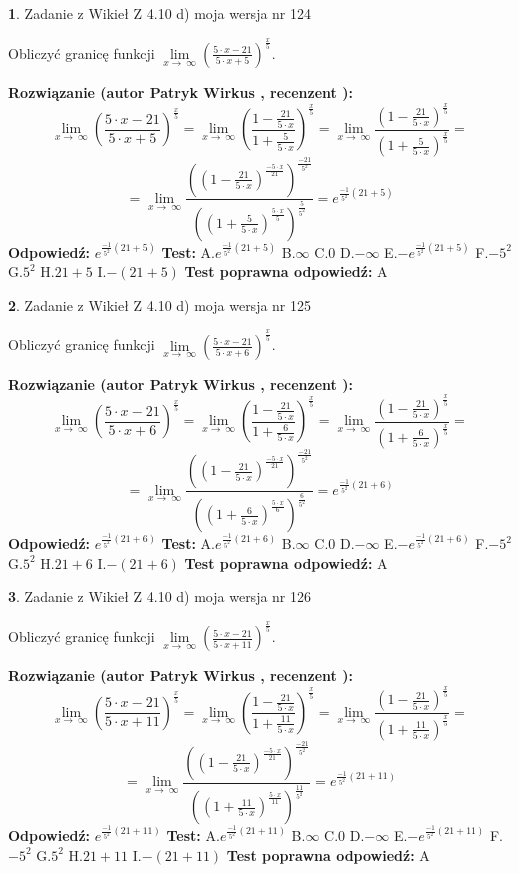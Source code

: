 \documentclass[12pt, a4paper]{article}
\theoremstyle{definition} %
\newtheorem{zad}{}
\newcommand{\zadStart}[1]{\begin{zad}#1\newline}
\newcommand{\zadStop}{\end{zad}}
\newcommand{\rozwStart}[2]{\noindent \textbf{Rozwiązanie (autor #1 , recenzent #2): }\newline}
\newcommand{\rozwStop}{\newline}
\newcommand{\odpStart}{\noindent \textbf{Odpowiedź:}\newline}
\newcommand{\odpStop}{\newline}
\newcommand{\testStart}{\noindent \textbf{Test:}\newline}
\newcommand{\testStop}{\newline}
\newcommand{\kluczStart}{\noindent \textbf{Test poprawna odpowiedź:}\newline}
\newcommand{\kluczStop}{\newline}
\begin{document}
\zadStart{Zadanie z Wikieł Z 4.10 d) moja wersja nr 124}


Obliczyć granicę funkcji  $\lim\limits_{x\to\ \infty}(\frac{5\cdot x-21}{5\cdot x+5})^{\frac{x}{5}}$.
\zadStop
\rozwStart{Patryk Wirkus}{}
$$\lim\limits_{x\to\ \infty}(\frac{5\cdot x-21}{5\cdot x+5})^{\frac{x}{5}} = \lim\limits_{x\to\ \infty}(\frac{1-\frac{21}{5\cdot x}}{1+\frac{5}{5\cdot x}})^{\frac{x}{5}}=\lim\limits_{x\to\ \infty}\frac{(1-\frac{21}{5\cdot x})^{\frac{x}{5}}}{(1+\frac{5}{5\cdot x})^{\frac{x}{5}}}=$$
$$=\lim\limits_{x\to\ \infty}\frac{((1-\frac{21}{5\cdot x})^{\frac{-5\cdot x}{21}})^{\frac{-21}{5^{2}}}}{((1+\frac{5}{5\cdot x})^{\frac{5\cdot x}{5}})^{\frac{5}{5^{2}}}}=e^{\frac{-1}{5^{2}}(21+5)}$$
\rozwStop
\odpStart
$e^{\frac{-1}{5^{2}}(21+5)}$
\odpStop
\testStart
A.$e^{\frac{-1}{5^{2}}(21+5)}$ B.$\infty$ C.$0$ D.$-\infty$ E.$-e^{\frac{-1}{5^{2}}(21+5)}$
F.$-5^{2}$ G.$5^{2}$
H.$21+5$
I.$-(21+5)$
\testStop
\kluczStart
A
\kluczStop



\zadStart{Zadanie z Wikieł Z 4.10 d) moja wersja nr 125}


Obliczyć granicę funkcji  $\lim\limits_{x\to\ \infty}(\frac{5\cdot x-21}{5\cdot x+6})^{\frac{x}{5}}$.
\zadStop
\rozwStart{Patryk Wirkus}{}
$$\lim\limits_{x\to\ \infty}(\frac{5\cdot x-21}{5\cdot x+6})^{\frac{x}{5}} = \lim\limits_{x\to\ \infty}(\frac{1-\frac{21}{5\cdot x}}{1+\frac{6}{5\cdot x}})^{\frac{x}{5}}=\lim\limits_{x\to\ \infty}\frac{(1-\frac{21}{5\cdot x})^{\frac{x}{5}}}{(1+\frac{6}{5\cdot x})^{\frac{x}{5}}}=$$
$$=\lim\limits_{x\to\ \infty}\frac{((1-\frac{21}{5\cdot x})^{\frac{-5\cdot x}{21}})^{\frac{-21}{5^{2}}}}{((1+\frac{6}{5\cdot x})^{\frac{5\cdot x}{6}})^{\frac{6}{5^{2}}}}=e^{\frac{-1}{5^{2}}(21+6)}$$
\rozwStop
\odpStart
$e^{\frac{-1}{5^{2}}(21+6)}$
\odpStop
\testStart
A.$e^{\frac{-1}{5^{2}}(21+6)}$ B.$\infty$ C.$0$ D.$-\infty$ E.$-e^{\frac{-1}{5^{2}}(21+6)}$
F.$-5^{2}$ G.$5^{2}$
H.$21+6$
I.$-(21+6)$
\testStop
\kluczStart
A
\kluczStop



\zadStart{Zadanie z Wikieł Z 4.10 d) moja wersja nr 126}


Obliczyć granicę funkcji  $\lim\limits_{x\to\ \infty}(\frac{5\cdot x-21}{5\cdot x+11})^{\frac{x}{5}}$.
\zadStop
\rozwStart{Patryk Wirkus}{}
$$\lim\limits_{x\to\ \infty}(\frac{5\cdot x-21}{5\cdot x+11})^{\frac{x}{5}} = \lim\limits_{x\to\ \infty}(\frac{1-\frac{21}{5\cdot x}}{1+\frac{11}{5\cdot x}})^{\frac{x}{5}}=\lim\limits_{x\to\ \infty}\frac{(1-\frac{21}{5\cdot x})^{\frac{x}{5}}}{(1+\frac{11}{5\cdot x})^{\frac{x}{5}}}=$$
$$=\lim\limits_{x\to\ \infty}\frac{((1-\frac{21}{5\cdot x})^{\frac{-5\cdot x}{21}})^{\frac{-21}{5^{2}}}}{((1+\frac{11}{5\cdot x})^{\frac{5\cdot x}{11}})^{\frac{11}{5^{2}}}}=e^{\frac{-1}{5^{2}}(21+11)}$$
\rozwStop
\odpStart
$e^{\frac{-1}{5^{2}}(21+11)}$
\odpStop
\testStart
A.$e^{\frac{-1}{5^{2}}(21+11)}$ B.$\infty$ C.$0$ D.$-\infty$ E.$-e^{\frac{-1}{5^{2}}(21+11)}$
F.$-5^{2}$ G.$5^{2}$
H.$21+11$
I.$-(21+11)$
\testStop
\kluczStart
A
\kluczStop
\end{document}
